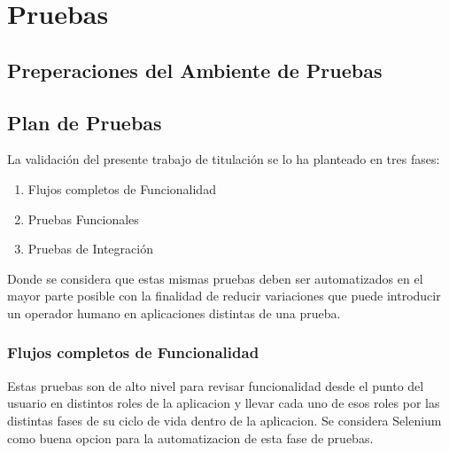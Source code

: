 
\chapter{Pruebas}
\label{capitulo5}

\section{Preperaciones del Ambiente de Pruebas}

\section{Plan de Pruebas}
La validación del presente trabajo de titulación se lo ha planteado en tres fases:
\begin{enumerate}
  \item Flujos completos de Funcionalidad
  \item Pruebas Funcionales
  \item Pruebas de Integración
\end{enumerate}
Donde se considera que estas mismas pruebas deben ser automatizados en el mayor parte posible con la finalidad de reducir variaciones que puede introducir un operador humano en aplicaciones distintas de una prueba.

\subsection{Flujos completos de Funcionalidad}
Estas pruebas son de alto nivel para revisar funcionalidad desde el punto del usuario en distintos roles de la aplicacion y llevar cada uno de esos roles por las distintas fases de su ciclo de vida dentro de la aplicacion. Se considera Selenium como buena opcion para la automatizacion de esta fase de pruebas.

